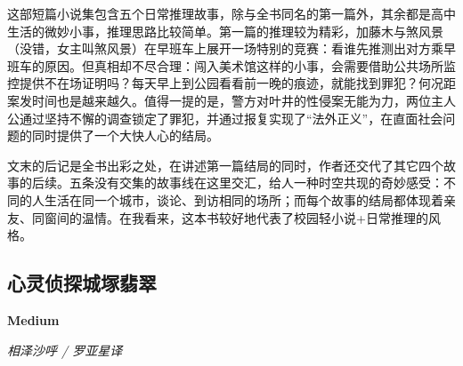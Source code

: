 \par 这部短篇小说集包含五个日常推理故事，除与全书同名的第一篇外，其余都是高中生活的微妙小事，推理思路比较简单。第一篇的推理较为精彩，加藤木与煞风景（没错，女主叫煞风景）在早班车上展开一场特别的竞赛：看谁先推测出对方乘早班车的原因。但真相却不尽合理：闯入美术馆这样的小事，会需要借助公共场所监控提供不在场证明吗？每天早上到公园看看前一晚的痕迹，就能找到罪犯？何况距案发时间也是越来越久。值得一提的是，警方对叶井的性侵案无能为力，两位主人公通过坚持不懈的调查锁定了罪犯，并通过报复实现了“法外正义”，在直面社会问题的同时提供了一个大快人心的结局。
\par 文末的后记是全书出彩之处，在讲述第一篇结局的同时，作者还交代了其它四个故事的后续。五条没有交集的故事线在这里交汇，给人一种时空共现的奇妙感受：不同的人生活在同一个城市，谈论、到访相同的场所；而每个故事的结局都体现着亲友、同窗间的温情。在我看来，这本书较好地代表了校园轻小说+日常推理的风格。
\par {}

\subsection*{心灵侦探城{塚}翡翠}
\par \textbf{Medium}
\par \emph{相泽沙呼 / 罗亚星译} 

